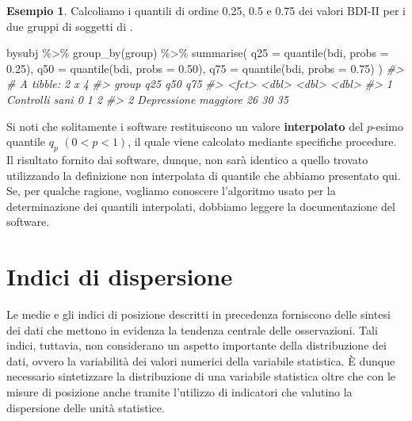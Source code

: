\documentclass[
  10pt,
  italian,
  a4paper,
  extrafontsizes,onecolumn,openright
  ]{memoir}
\newenvironment{Shaded}{\begin{snugshade}}{\end{snugshade}}
\newcommand{\AttributeTok}[1]{\textcolor[rgb]{0.77,0.63,0.00}{#1}}
\newcommand{\CommentTok}[1]{\textcolor[rgb]{0.56,0.35,0.01}{\textit{#1}}}
\newcommand{\FloatTok}[1]{\textcolor[rgb]{0.00,0.00,0.81}{#1}}
\newcommand{\FunctionTok}[1]{\textcolor[rgb]{0.00,0.00,0.00}{#1}}
\newcommand{\NormalTok}[1]{#1}
\newcommand{\SpecialCharTok}[1]{\textcolor[rgb]{0.00,0.00,0.00}{#1}}
\theoremstyle{definition}
\theoremstyle{definition}
\newtheorem{example}{Esempio}[chapter]
\theoremstyle{definition}
\theoremstyle{definition}
\theoremstyle{remark}
\begin{document}
\begin{example}

Calcoliamo i quantili di ordine 0.25, 0.5 e 0.75 dei valori BDI-II per i due gruppi di soggetti di \textcite{zetschefuture2019}.

\begin{Shaded}
\begin{Highlighting}[]
\NormalTok{bysubj }\SpecialCharTok{\%\textgreater{}\%} 
  \FunctionTok{group\_by}\NormalTok{(group) }\SpecialCharTok{\%\textgreater{}\%} 
  \FunctionTok{summarise}\NormalTok{(}
    \AttributeTok{q25 =} \FunctionTok{quantile}\NormalTok{(bdi, }\AttributeTok{probs =} \FloatTok{0.25}\NormalTok{),}
    \AttributeTok{q50 =} \FunctionTok{quantile}\NormalTok{(bdi, }\AttributeTok{probs =} \FloatTok{0.50}\NormalTok{),}
    \AttributeTok{q75 =} \FunctionTok{quantile}\NormalTok{(bdi, }\AttributeTok{probs =} \FloatTok{0.75}\NormalTok{)}
\NormalTok{  ) }
\CommentTok{\#\textgreater{} \# A tibble: 2 x 4}
\CommentTok{\#\textgreater{}   group                  q25   q50   q75}
\CommentTok{\#\textgreater{}   \textless{}fct\textgreater{}                \textless{}dbl\textgreater{} \textless{}dbl\textgreater{} \textless{}dbl\textgreater{}}
\CommentTok{\#\textgreater{} 1 Controlli sani           0     1     2}
\CommentTok{\#\textgreater{} 2 Depressione maggiore    26    30    35}
\end{Highlighting}
\end{Shaded}

\end{example}

Si noti che solitamente i software restituiscono un valore \textbf{interpolato} del \(p\)-esimo quantile \(q_p\) \((0 < p < 1)\), il quale viene calcolato mediante specifiche procedure. Il risultato fornito dai software, dunque, non sarà identico a quello trovato utilizzando la definizione non interpolata di quantile che abbiamo presentato qui. Se, per qualche ragione, vogliamo conoscere l'algoritmo usato per la determinazione dei quantili interpolati, dobbiamo leggere la documentazione del software.

\hypertarget{indici-di-dispersione}{%
\section{Indici di dispersione}\label{indici-di-dispersione}}

Le medie e gli indici di posizione descritti in precedenza forniscono
delle sintesi dei dati che mettono in evidenza la tendenza centrale
delle osservazioni. Tali indici, tuttavia, non considerano un aspetto
importante della distribuzione dei dati, ovvero la variabilità dei
valori numerici della variabile statistica. È dunque necessario
sintetizzare la distribuzione di una variabile statistica oltre che con
le misure di posizione anche tramite l'utilizzo di indicatori che
valutino la dispersione delle unità statistice.
\end{document}
